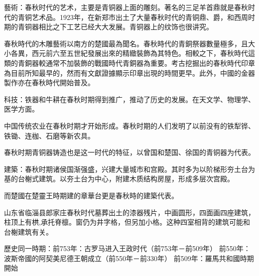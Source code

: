 藝術：春秋时代的艺术，主要是青铜器上面的雕刻。著名的三足羊首鼎就是春秋时代的青铜艺术品。1923年，在新郑市出土了大量春秋时代的青铜鼎、爵，和西周时期的青铜器相比之下工艺已经大大发展。青铜器上的纹饰也很讲究。

春秋時代的木雕藝術以南方的楚國最為聞名。春秋時代的青銅祭器數量極多，且大小各異，西元前六至五世紀發展出來的精緻裝飾為其特色。相較之下，春秋時代這類的青銅器較通常不加裝飾的戰國時代青銅器為重要。考古挖掘出的春秋時代印章為目前所知最早的，然而有文獻證據顯示印章出現的時間更早。此外，中國的金器製作亦在春秋時代開始普及。

科技：铁器和牛耕在春秋时期得到推广，推动了历史的发展。在天文学、物理学、医学方面。

中国传统农业在春秋时期才开始形成。春秋时期的人们发明了以前没有的铁犁铧、铁锄、连枷、石磨等新农具。

春秋时期青铜器铸造也是这一时代的特征，以曾国和楚国、徐国的青铜器为代表。

建築：春秋时期诸侯国渐强盛，兴建大量城市和宫殿。其时多为以阶梯形夯土台为基的台榭式建筑。以夯土台为中心，附建木质结构房屋，形成多层次宫殿。

而楚國在楚靈王時期建的章華台更是春秋時的建築代表。

山东省临淄县郎家庄春秋时代墓葬出土的漆器残片，中画圆形，四面画四座建筑，柱顶上有栱,承托脊檩。窗仍为井字格，但另加小格。这种四室相背的建筑可能和台榭建筑有关。

歷史同一時期：前753年：古罗马进入王政时代（前753年－前509年） 前550年：波斯帝國的阿契美尼德王朝成立（前550年－前330年） 前509年：羅馬共和國時期開始


% 

% 


